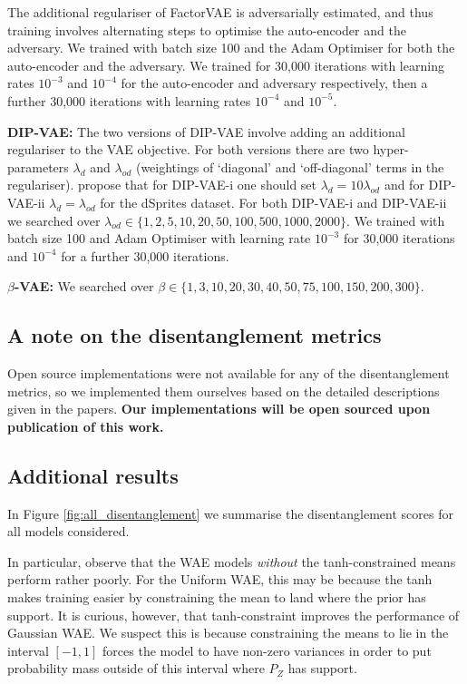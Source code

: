 The additional regulariser of FactorVAE is adversarially estimated, and thus training involves alternating steps to optimise the auto-encoder and the adversary. We trained with batch size 100 and the Adam Optimiser for both the auto-encoder and the adversary.  We trained for 30,000 iterations with learning rates $10^{-3}$ and $10^{-4}$ for the auto-encoder and adversary respectively, then a further 30,000 iterations with learning rates $10^{-4}$ and $10^{-5}$.

\textbf{DIP-VAE:} The two versions of DIP-VAE involve adding an additional regulariser to the VAE objective. For both versions there are two hyper-parameters $\lambda_d$ and $\lambda_{od}$ (weightings of `diagonal' and `off-diagonal' terms in the regulariser). \cite{kumar2017variational} propose that for DIP-VAE-i one should set $\lambda_d = 10\lambda_{od}$ and for DIP-VAE-ii $\lambda_d = \lambda_{od}$ for the dSprites dataset. 
For both DIP-VAE-i and DIP-VAE-ii we  searched over ${\lambda_{od} \in \{1, 2, 5, 10, 20, 50, 100, 500, 1000, 2000\}}$. We trained with batch size 100 and Adam Optimiser with learning rate $10^{-3}$ for 30,000 iterations and $10^{-4}$ for a further 30,000 iterations.

\textbf{$\beta$-VAE:} We searched over $\beta \in \{1, 3, 10, 20, 30, 40, 50, 75, 100, 150, 200, 300\}$.

\subsection{A note on the disentanglement metrics}
Open source implementations were not available for any of the disentanglement metrics, so we implemented them ourselves based on the detailed descriptions given in the papers. \textbf{Our implementations will be open sourced upon publication of this work.} 


\subsection{Additional results}

In Figure \ref{fig:all_disentanglement} we summarise the disentanglement scores for all models considered.

In particular, observe that the WAE models \emph{without} the tanh-constrained means perform rather poorly. For the Uniform WAE, this may be because the tanh makes training easier by constraining the mean to land where the prior has support. It is curious, however, that tanh-constraint improves the performance of Gaussian WAE. We suspect this is because constraining the means to lie in the interval $[-1, 1]$ forces the model to have non-zero variances in order to put probability mass outside of this interval where $P_Z$ has support.


